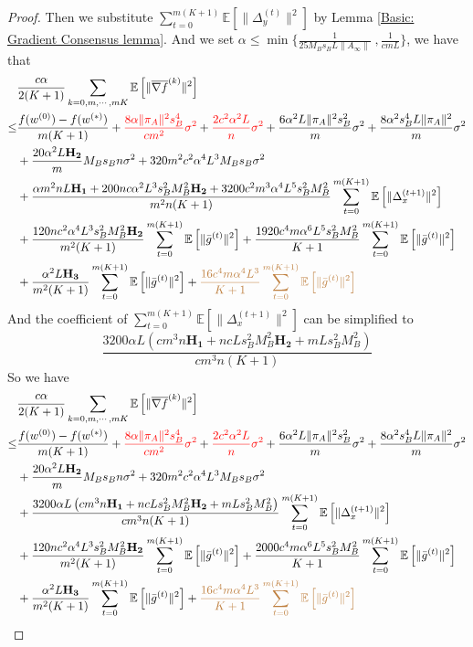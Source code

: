 \documentclass{article}
\newcommand{\EE}[1]{\mathbb{E}\left[#1\right]}
\newcommand{\norm}[1]{\| #1 \|}
\begin{document}
\begin{proof}
  Then we substitute $\sum_{t=0}^{m(K+1)}\EE{\norm{\Delta_y^{(t)}}^2}$ by Lemma \ref{Basic: Gradient Consensus lemma}. And we set $\alpha \leq \min\{\frac{1}{25M_Bs_BL\norm{A_{\infty}}}\;, \frac{1}{cmL}\}$, we have that 
  \begin{align*}
    &\frac{c\alpha }{2(K+1)}\sum_{k=0,m,\cdots,mK}\EE{\norm{\overline{\nabla f}^{(k)}}^2}
  \\\leq& \frac{f(w^{(0)})-f(w^{(*)})}{m(K+1)}+\textcolor{red}{\frac{8\alpha \norm{\pi_A}^2s_B^4}{cm^2}\sigma^2}+\textcolor{red}{ \frac{2c^2\alpha^2L}{n}\sigma^2}+\frac{6\alpha^2L\norm{\pi_A}^2s_B^2}{m}\sigma^2+\frac{8\alpha^2s_B^4L\norm{\pi_A}^2}{m}\sigma^2\\&+\frac{20\alpha^2 L \mathbf{H_2}}{m}M_Bs_Bn \sigma^2+320m^2c^2\alpha^4L^3M_Bs_B\sigma^2\\&+\frac{\alpha m^2nL\mathbf{H_1}+200nc\alpha^2 L^3s_B^2M_B^2\mathbf{H_2} +3200c^2m^3\alpha^4L^5s_B^2M_B^2}{m^2n(K+1)}\sum_{t=0}^{m(K+1)}\EE{\norm{\Delta_x^{(t+1)}}^2}\\&+\frac{120nc^2\alpha^4 L^3s_B^2M_B^2 \mathbf{H_2}}{m^2(K+1)} \sum_{t=0}^{m(K+1)} \EE{\norm{\bar{g}^{(t)}}^2}+\frac{1920c^4m\alpha^6L^5s_B^2M_B^2 }{K+1}\sum_{t=0}^{m(K+1)}\EE{\norm{\bar{g}^{(t)}}^2} \\&+\frac{\alpha^2 L \mathbf{H_3}}{m^2(K+1)}\sum_{t=0}^{m(K+1)}\EE{\norm{\bar{g}^{(t)}}^2}+\textcolor{brown}{\frac{16c^4m\alpha^4L^3}{K+1}\sum_{t=0}^{m(K+1)}\EE{\norm{\bar{g}^{(t)}}^2}}
  \end{align*}
  And the coefficient of $\sum_{t=0}^{m(K+1)}\EE{\norm{\Delta_x^{(t+1)}}^2}$ can be simplified to
  $$\frac{3200\alpha L \left(cm^3n\mathbf{H_1}+nc Ls_B^2M_B^2\mathbf{H_2} +mLs_B^2M_B^2\right)}{cm^3n(K+1)}$$
  So we have 
  \begin{align*}
    &\frac{c\alpha }{2(K+1)}\sum_{k=0,m,\cdots,mK}\EE{\norm{\overline{\nabla f}^{(k)}}^2}
  \\\leq& \frac{f(w^{(0)})-f(w^{(*)})}{m(K+1)}+\textcolor{red}{\frac{8\alpha \norm{\pi_A}^2s_B^4}{cm^2}\sigma^2}+\textcolor{red}{ \frac{2c^2\alpha^2L}{n}\sigma^2}+\frac{6\alpha^2L\norm{\pi_A}^2s_B^2}{m}\sigma^2+\frac{8\alpha^2s_B^4L\norm{\pi_A}^2}{m}\sigma^2\\&+\frac{20\alpha^2 L \mathbf{H_2}}{m}M_Bs_Bn \sigma^2+320m^2c^2\alpha^4L^3M_Bs_B\sigma^2\\&+\frac{3200\alpha L \left(cm^3n\mathbf{H_1}+nc Ls_B^2M_B^2\mathbf{H_2} +mLs_B^2M_B^2\right)}{cm^3n(K+1)}\sum_{t=0}^{m(K+1)}\EE{\norm{\Delta_x^{(t+1)}}^2}\\&+\frac{120nc^2\alpha^4 L^3s_B^2M_B^2 \mathbf{H_2}}{m^2(K+1)} \sum_{t=0}^{m(K+1)} \EE{\norm{\bar{g}^{(t)}}^2}+\frac{2000c^4m\alpha^6L^5s_B^2M_B^2 }{K+1}\sum_{t=0}^{m(K+1)}\EE{\norm{\bar{g}^{(t)}}^2} \\&+\frac{\alpha^2 L \mathbf{H_3}}{m^2(K+1)}\sum_{t=0}^{m(K+1)}\EE{\norm{\bar{g}^{(t)}}^2}+\textcolor{brown}{\frac{16c^4m\alpha^4L^3}{K+1}\sum_{t=0}^{m(K+1)}\EE{\norm{\bar{g}^{(t)}}^2}}

\end{align*}
\end{proof}
\end{document}
